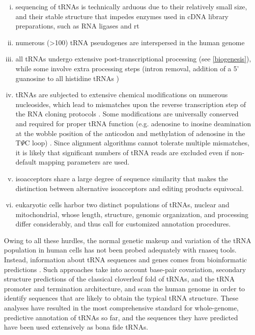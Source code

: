 \documentclass[12pt]{rockefeller}
\begin{document}
\begin{enumerate}[i)]
\item sequencing of tRNAs is technically arduous due to their relatively small size, and their stable structure that impedes enzymes used in cDNA library preparations, such as RNA ligases and \gls{rt}
\item numerous (>100) tRNA pseudogenes are interspersed in the human genome \cite{Lowe:1997uc,Chan:2009dz}
\item all tRNAs undergo extensive post-transcriptional processing (see \ref{biogenesis}), while some involve extra processing steps (intron removal, addition of a 5’ guanosine to all histidine tRNAs \cite{Gu:2003jj})
\item tRNAs are subjected to extensive chemical modifications on numerous nucleosides, which lead to mismatches upon the reverse transcription step of the RNA cloning protocols \cite{Jackman:2012ki,Lee:2013cg}. Some modifications are universally conserved and required for proper tRNA function (e.g. adenosine to inosine deamination at the wobble position of the anticodon and methylation of adenosine in the T$\Psi$C loop) \cite{Jackman:2012ki,Gustilo:2008ge}. Since alignment algorithms cannot tolerate multiple mismatches, it is likely that significant numbers of tRNA reads are excluded even if non-default mapping parameters are used.
\item \gls{isoacceptors} share a large degree of sequence similarity that makes the distinction between alternative isoacceptors and editing products equivocal. 
\item eukaryotic cells harbor two distinct populations of tRNAs, nuclear and mitochondrial, whose length, structure, genomic organization, and processing differ considerably, and thus call for customized annotation procedures.
\end{enumerate}

Owing to all these hurdles, the normal genetic makeup and variation of the tRNA population in human cells has not been probed adequately with \gls{rnaseq} tools. Instead, information about tRNA sequences and genes comes from bioinformatic predictions \cite{Lowe:1997uc,Chan:2009dz}. Such approaches take into account base-pair covariation, secondary structure predictions of the classical cloverleaf fold of tRNAs, and the tRNA promoter and termination architecture, and scan the human genome in order to identify sequences that are likely to obtain the typical tRNA structure. These analyses have resulted in the most comprehensive standard for whole-genome, predictive annotation of tRNAs so far, and the sequences they have predicted have been used extensively as bona fide tRNAs.
\end{document}
